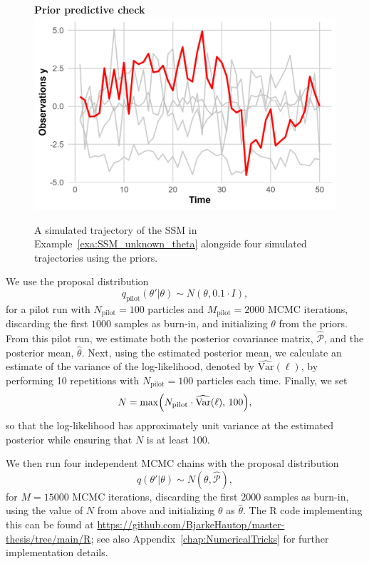\begin{example}[SSM with unknown $\theta$]
	\begin{figure}
		\centering
		\textbf{Prior predictive check}
		\includegraphics{prior_predictive_check.png}
		\caption{A simulated trajectory of the SSM in Example~\ref{exa:SSM_unknown_theta} alongside four simulated trajectories using the priors.}
		\label{fig:Prior_predictive_check}
	\end{figure}
	
	We use the proposal distribution
	\[
	q_{\text{pilot}}(\theta' \vert \theta) \sim N(\theta, 0.1 \cdot I),
	\]
	for a pilot run with $N_{\text{pilot}}=100$ particles and $M_{\text{pilot}}=2000$ \gls*{MCMC} iterations, discarding the first $1000$ samples as burn-in, and initializing $\theta$ from the priors. From this pilot run, we estimate both the posterior covariance matrix, $\hat{\mathcal{P}}$, and the posterior mean, $\hat{\theta}$. Next, using the estimated posterior mean, we calculate an estimate of the variance of the log-likelihood, denoted by $\widehat{\text{Var}}(\ell)$, by performing 10 repetitions with $N_{\text{pilot}}=100$ particles each time. Finally, we set
	\[
	N = \max\Bigl( N_{\text{pilot}} \cdot \widehat{\text{Var}}(\ell), \, 100 \Bigr),
	\]
	so that the log-likelihood has approximately unit variance at the estimated posterior while ensuring that $N$ is at least 100.
	
	We then run four independent \gls*{MCMC} chains with the proposal distribution
	\[
	q(\theta' \vert \theta) \sim N(\theta, \hat{\mathcal{P}}),
	\]
	for $M=15000$ \gls*{MCMC} iterations, discarding the first $2000$ samples as burn-in, using the value of $N$ from above and initializing $\theta$ as $\hat{\theta}$. The R code implementing this can be found at \url{https://github.com/BjarkeHautop/master-thesis/tree/main/R}; see also Appendix~\ref{chap:NumericalTricks} for further implementation details.
	

\end{example}
